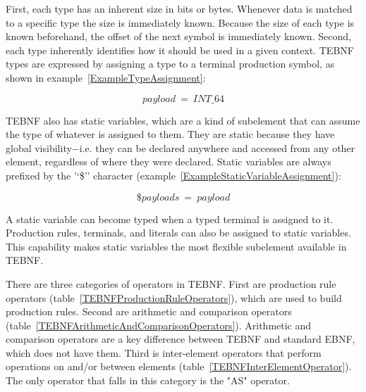 \indent
First, each type has an inherent size in bits or bytes.  Whenever data is matched to a specific type the size is immediately known.  Because the size of each type is known beforehand, the offset of the next symbol is immediately known.  Second, each type inherently identifies how it should be used in a given context.  TEBNF types are expressed by assigning a type to a terminal production symbol, as shown in example~\ref{ExampleTypeAssignment}:

\begin{equation}
payload\ =\ INT\_64
\label{ExampleTypeAssignment}
\end{equation}

\indent
TEBNF also has static variables, which are a kind of subelement that can assume the type of whatever is assigned to them.  They are static because they have global visibility$-$i.e. they can be declared anywhere and accessed from any other element, regardless of where they were declared.  Static variables are always prefixed by the '‘\$'’ character (example~\ref{ExampleStaticVariableAssignment}):

\begin{equation}
\$payloads\ =\ payload
\label{ExampleStaticVariableAssignment}
\end{equation}

\indent
A static variable can become typed when a typed terminal is assigned to it.  Production rules, terminals, and literals can also be assigned to static variables.  This capability makes static variables the most flexible subelement available in TEBNF.

\label{sec:TEBNFOperators}
There are three categories of operators in TEBNF.  First are production rule operators (table~\ref{TEBNFProductionRuleOperators}), which are used to build production rules.  Second are arithmetic and comparison operators (table~\ref{TEBNFArithmeticAndComparisonOperators}).  Arithmetic and comparison operators are a key difference between TEBNF and standard EBNF, which does not have them.  Third is inter-element operators that perform operations on and/or between elements (table~\ref{TEBNFInterElementOperator}).  The only operator that falls in this category is the "AS" operator.

